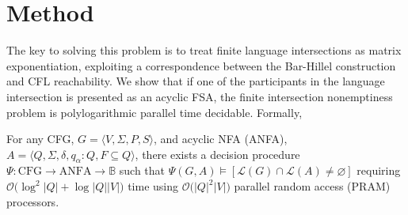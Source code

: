 \documentclass[sigplan,acmsmall,nonacm,screen]{acmart}\settopmatter{printfolios=false,printccs=false,printacmref=false}
\begin{document}
\clearpage\section{Method}\label{sec:method}

The key to solving this problem is to treat finite language intersections as matrix exponentiation, exploiting a correspondence between the Bar-Hillel construction and CFL reachability. We show that if one of the participants in the language intersection is presented as an acyclic FSA, the finite intersection nonemptiness problem is polylogarithmic parallel time decidable. Formally,

\begin{theorem}\label{thm:parallel_decision_complexity}
  For any CFG, $G = \langle V, \Sigma, P, S\rangle$, and acyclic NFA (ANFA), $A = \langle Q, \Sigma, \delta, q_\alpha: Q, F \subseteq Q\rangle$, there exists a decision procedure $\Psi: \text{CFG} \rightarrow \text{ANFA} \rightarrow \mathbb{B}$ such that $\Psi(G, A) \models [\mathcal{L}(G)\cap\mathcal{L}(A) \neq \varnothing]$ requiring $\mathcal{O}\big(\log^2|Q|+\log|Q||V|\big)$ time using $\mathcal{O}\big(|Q|^2|V|\big)$ parallel random access (PRAM) processors.
\end{theorem}
\end{document}
